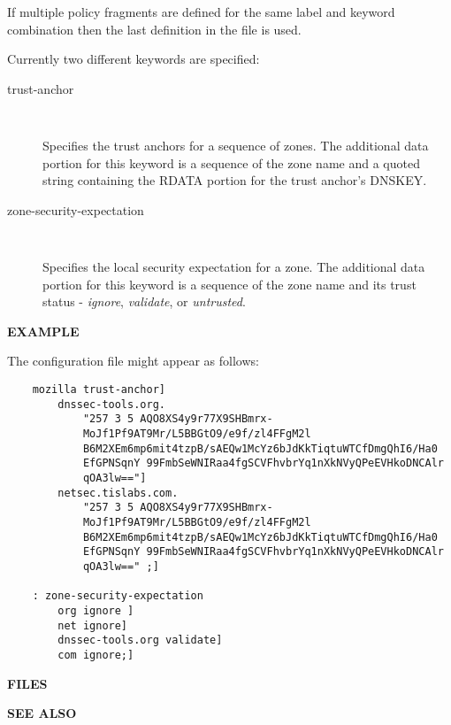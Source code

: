 \begin{description}
If multiple policy fragments are defined for the same label and keyword
combination then the last definition in the file is used.

Currently two different keywords are specified:

\begin{description}

\item [trust-anchor]\verb" "

Specifies the trust anchors for a sequence of zones.  The additional
data portion for this keyword is a sequence of the zone name and a 
quoted string containing the RDATA portion for the trust anchor's 
DNSKEY.

\item [zone-security-expectation]\verb" "

Specifies the local security expectation for a zone.  The additional
data portion for this keyword is a sequence of the zone name and 
its trust status - {\it ignore}, {\it validate}, or {\it untrusted}.

\end{description}
\end{description}

{\bf EXAMPLE}

The  configuration file might appear as follows:

\begin{verbatim}
    mozilla trust-anchor]
        dnssec-tools.org.
            "257 3 5 AQO8XS4y9r77X9SHBmrx-
            MoJf1Pf9AT9Mr/L5BBGtO9/e9f/zl4FFgM2l
            B6M2XEm6mp6mit4tzpB/sAEQw1McYz6bJdKkTiqtuWTCfDmgQhI6/Ha0
            EfGPNSqnY 99FmbSeWNIRaa4fgSCVFhvbrYq1nXkNVyQPeEVHkoDNCAlr
            qOA3lw=="]
        netsec.tislabs.com.
            "257 3 5 AQO8XS4y9r77X9SHBmrx-
            MoJf1Pf9AT9Mr/L5BBGtO9/e9f/zl4FFgM2l
            B6M2XEm6mp6mit4tzpB/sAEQw1McYz6bJdKkTiqtuWTCfDmgQhI6/Ha0
            EfGPNSqnY 99FmbSeWNIRaa4fgSCVFhvbrYq1nXkNVyQPeEVHkoDNCAlr
            qOA3lw==" ;]

    : zone-security-expectation
        org ignore ]
        net ignore]
        dnssec-tools.org validate]
        com ignore;]
\end{verbatim}

{\bf FILES}




{\bf SEE ALSO}


